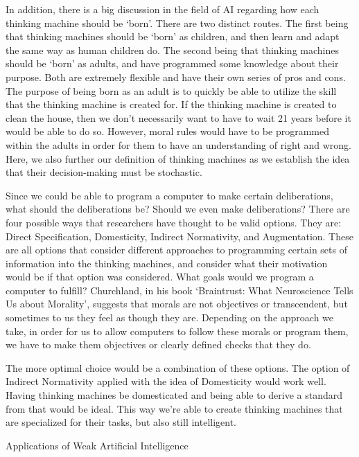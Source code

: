 \documentclass[11pt]{article}
\begin{document}
\par In addition, there is a big discussion in the field of AI regarding how each thinking machine should be `born'. There are two distinct routes. The first being that thinking machines should be `born' as children, and then learn and adapt the same way as human children do. The second being that thinking machines should be `born' as adults, and have programmed some knowledge about their purpose. Both are extremely flexible and have their own series of pros and cons. The purpose of being born as an adult is to quickly be able to utilize the skill that the thinking machine is created for. If the thinking machine is created to clean the house, then we don't necessarily want to have to wait 21 years before it would be able to do so. However, moral rules would have to be programmed within the adults in order for them to have an understanding of right and wrong. Here, we also further our definition of thinking machines as we establish the idea that their decision-making must be stochastic.

\par Since we could be able to program a computer to make certain deliberations, what should the deliberations be? Should we even make deliberations? There are four possible ways that researchers have thought to be valid options. They are: Direct Specification, Domesticity, Indirect Normativity, and Augmentation. These are all options that consider different approaches to programming certain sets of information into the thinking machines, and consider what their motivation would be if that option was considered. What goals would we program a computer to fulfill? Churchland, in his book `Braintrust: What Neuroscience Tells Us about Morality', suggests that morals are not objectives or transcendent, but sometimes to us they feel as though they are. Depending on the approach we take, in order for us to allow computers to follow these morals or program them, we have to make them objectives or clearly defined checks that they do.

\par The more optimal choice would be a combination of these options. The option of Indirect Normativity applied with the idea of Domesticity would work well. Having thinking machines be domesticated and being able to derive a standard from that would be ideal. This way we're able to create thinking machines that are specialized for their tasks, but also still intelligent.

\begin{center}
	{\large Applications of Weak Artificial Intelligence\par}
\end{center}
\end{document}
